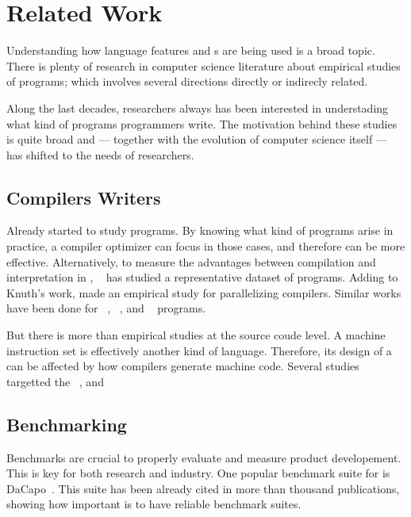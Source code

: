 
\chapter{Related Work}

Understanding how language features and \api{}s are being used is a broad topic.
There is plenty of research in computer science literature about empirical studies of programs;
which involves several directions directly or indirecly related.

Along the last decades, researchers always has been interested in understading what kind of programs programmers write.
The motivation behind these studies is quite broad and --- together with the evolution of computer science itself --- has shifted to the needs of researchers.

\section{Compilers Writers}

Already \cite{knuth_empirical_1971} started to study \fortran{} programs.
By knowing what kind of programs arise in practice, a compiler optimizer can focus in those cases, and therefore can be more effective.
Alternatively, to measure the advantages between compilation and interpretation in \basic{}, ~\cite{hammond_basic_1977} has studied a representative dataset of programs.
Adding to Knuth's work, \cite{shen_empirical_1990} made an empirical study for parallelizing compilers.
Similar works have been done for \cobol{}~\cite{salvadori_static_1975,chevance_static_1978}, \pascal{}~\cite{cook_contextual_1982}, and \apl{}~\cite{saal_properties_1975,saal_empirical_1977} programs.

But there is more than empirical studies at the source coude level.
A machine instruction set is effectively another kind of language.
Therefore, its design of a can be affected by how compilers generate machine code.
Several studies targetted the \jvm{}~\cite{collberg_empirical_2007,odonoghue_bigram_2002,antonioli_analysis_1998}, and \lilith{}~\cite{cook_empirical_1989}


\section{Benchmarking}

Benchmarks are crucial to properly evaluate and measure product developement.
This is key for both research and industry.
One popular benchmark suite for \java{} is DaCapo~\cite{blackburn_dacapo_2006}.
This suite has been already cited in more than thousand publications, showing how important is to have reliable benchmark suites.

